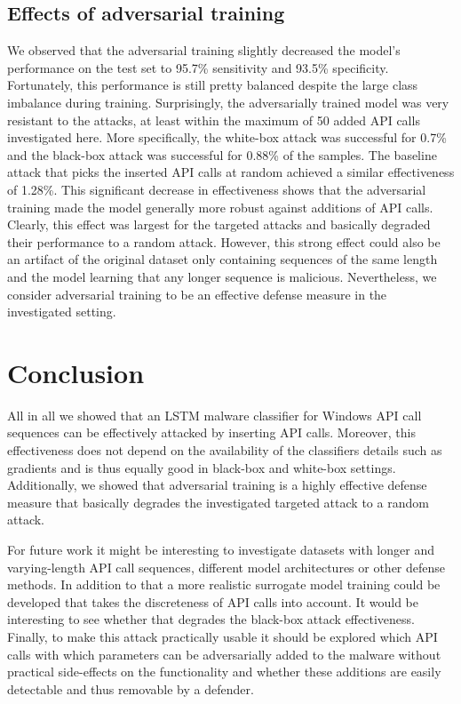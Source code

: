\documentclass[final]{cvpr}
\begin{document}
\subsection{Effects of adversarial training}
We observed that the adversarial training slightly decreased the model's 
performance on 
the test set to 95.7\% sensitivity and 93.5\% specificity. Fortunately, this 
performance is still pretty balanced despite the large class imbalance during 
training. Surprisingly, the adversarially trained model was very resistant to 
the attacks, at least within the maximum of 50 added API calls investigated 
here. More specifically, the white-box attack was successful for 0.7\% and the 
black-box attack was successful for 0.88\% of the samples. The baseline attack 
that picks the inserted API calls at random achieved a similar effectiveness of 
1.28\%. This significant decrease in effectiveness shows that the adversarial 
training made the model generally more robust against additions of API calls. 
Clearly, 
this effect was largest for the targeted attacks and basically degraded their 
performance to a random attack. However, this strong effect could also be an 
artifact of the original dataset only containing sequences of the same length 
and the model learning that any longer sequence is malicious. 
Nevertheless, we consider adversarial training to 
be an effective defense measure in the investigated setting.

\section{Conclusion}
\label{sec:conclusion}
All in all we showed that an LSTM malware classifier for Windows API call 
sequences can be effectively attacked by inserting API calls. Moreover, this 
effectiveness does not depend on the availability of the classifiers details 
such as gradients and is thus equally good in black-box and white-box settings. 
Additionally, we showed that adversarial training is a highly effective defense 
measure that basically degrades the investigated targeted attack to a random 
attack.

For future work it might be interesting to investigate datasets with longer and 
varying-length API call sequences, different model architectures or other 
defense methods. In 
addition to that a more realistic surrogate model training could be developed 
that takes the discreteness of API calls into account. It would be interesting 
to see whether that degrades the black-box attack effectiveness. Finally, to 
make this attack practically usable it should be explored which API calls with 
which parameters can be adversarially added to the malware without practical 
side-effects 
on the functionality and whether these additions are easily detectable and thus 
removable by a defender.
\end{document}
